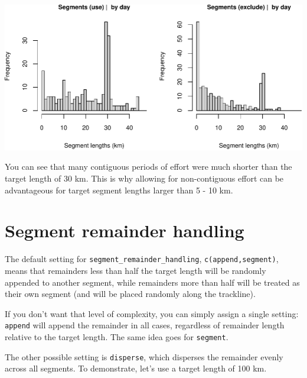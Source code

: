 \documentclass[
]{book}
\begin{document}
\includegraphics{figures/unnamed-chunk-97-1.pdf}

You can see that many contiguous periods of effort were much shorter than the target length of 30 km. This is why allowing for non-contiguous effort can be advantageous for target segment lengths larger than 5 - 10 km.

\hypertarget{segment-remainder-handling}{%
\section*{Segment remainder handling}\label{segment-remainder-handling}}

The default setting for \texttt{segment\_remainder\_handling}, \texttt{c(\textquotesingle{}append\textquotesingle{},\textquotesingle{}segment\textquotesingle{})}, means that remainders less than half the target length will be randomly appended to another segment, while remainders more than half will be treated as their own segment (and will be placed randomly along the trackline).

If you don't want that level of complexity, you can simply assign a single setting: \texttt{\textquotesingle{}append\textquotesingle{}} will append the remainder in all cases, regardless of remainder length relative to the target length. The same idea goes for \texttt{\textquotesingle{}segment\textquotesingle{}}.

The other possible setting is \texttt{\textquotesingle{}disperse\textquotesingle{}}, which disperses the remainder evenly across all segments. To demonstrate, let's use a target length of 100 km.
\end{document}
